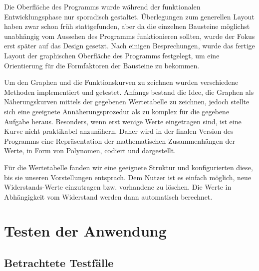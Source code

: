 \documentclass[a4paper]{article}
\begin{document}
    Die Oberfläche des Programms wurde während der funktionalen Entwicklungsphase nur sporadisch gestaltet.
    Überlegungen zum generellen Layout haben zwar schon früh stattgefunden, aber da die einzelnen Bausteine möglichst unabhängig vom Aussehen des Programms funktionieren sollten, wurde der Fokus erst später auf das Design gesetzt.
    Nach einigen Besprechungen, wurde das fertige Layout der graphischen Oberfläche des Programms festgelegt, um eine Orientierung für die Formfaktoren der Bausteine zu bekommen.

    Um den Graphen und die Funktionskurven zu zeichnen wurden verschiedene Methoden implementiert und getestet.
    Anfangs bestand die Idee, die Graphen als Näherungskurven mittels der gegebenen Wertetabelle zu zeichnen, jedoch stellte sich eine geeignete Annäherungsprozedur als zu komplex für die gegebene Aufgabe heraus.
    Besonders, wenn erst wenige Werte eingetragen sind, ist eine Kurve nicht praktikabel anzunähern.
    Daher wird in der finalen Version des Programms eine Repräsentation der mathematischen Zusammenhängen der Werte, in Form von Polynomen, codiert und dargestellt.

    Für die Wertetabelle fanden wir eine geeignete Struktur und konfigurierten diese, bis sie unseren Vorstellungen entsprach.
    Dem Nutzer ist es einfach möglich, neue Widerstands-Werte einzutragen bzw. vorhandene zu löschen.
    Die Werte in Abhängigkeit vom Widerstand werden dann automatisch berechnet.

\newpage
\section{Testen der Anwendung}

\subsection{Betrachtete Testfälle}
\end{document}
